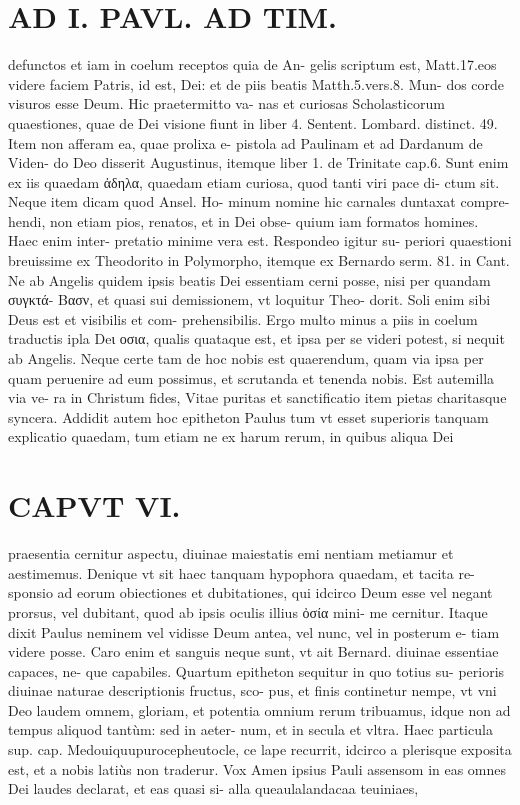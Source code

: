 \documentclass{article}
\begin{document}
\begin{pages}
\section*{AD I. PAVL. AD TIM. }
\marginpar{[ p.492 ]}\pstart defunctos et iam in coelum receptos quia de An- gelis scriptum est, Matt.17.eos videre faciem Patris, id est, Dei: et de piis beatis Matth.5.vers.8. Mun- dos corde visuros esse Deum. Hic praetermitto va- nas et curiosas Scholasticorum quaestiones, quae de Dei visione fiunt in liber 4. Sentent. Lombard. distinct. 49. Item non afferam ea, quae prolixa e- pistola ad Paulinam et ad Dardanum de Viden- do Deo disserit Augustinus, itemque liber 1. de Trinitate cap.6. Sunt enim ex iis quaedam ἀδηλα, quaedam etiam curiosa, quod tanti viri pace di- ctum sit. Neque item dicam quod Ansel. Ho- minum nomine hic carnales duntaxat compre- hendi, non etiam pios, renatos, et in Dei obse- quium iam formatos homines. Haec enim inter- pretatio minime vera est. Respondeo igitur su- periori quaestioni breuissime ex Theodorito in Polymorpho, itemque ex Bernardo serm. 81. in Cant. Ne ab Angelis quidem ipsis beatis Dei essentiam cerni posse, nisi per quandam συγκτά- Βασν, et quasi sui demissionem, vt loquitur Theo- dorit. Soli enim sibi Deus est et visibilis et com- prehensibilis. Ergo multo minus a piis in coelum traductis ipla Deι οσια, qualis quataque est, et ipsa per se videri potest, si nequit ab Angelis. Neque certe tam de hoc nobis est quaerendum, quam via ipsa per quam peruenire ad eum possimus, et scrutanda et tenenda nobis. Est autemilla via ve- ra in Christum fides, Vitae puritas et sanctificatio item pietas charitasque syncera.  \pend\pstart Addidit autem hoc epitheton Paulus tum vt esset superioris tanquam explicatio quaedam, tum etiam ne ex harum rerum, in quibus aliqua Dei  \pend
\section*{CAPVT VI. }
\marginpar{[ p.493 ]}\pstart praesentia cernitur aspectu, diuinae maiestatis emi nentiam metiamur et aestimemus. Denique vt sit haec tanquam hypophora quaedam, et tacita re- sponsio ad eorum obiectiones et dubitationes, qui idcirco Deum esse vel negant prorsus, vel dubitant, quod ab ipsis oculis illius ὀσία mini- me cernitur. Itaque dixit Paulus neminem vel vidisse Deum antea, vel nunc, vel in posterum e- tiam videre posse. Caro enim et sanguis neque sunt, vt ait Bernard. diuinae essentiae capaces, ne- que capabiles.  \pend\pstart Quartum epitheton sequitur in quo totius su- perioris diuinae naturae descriptionis fructus, sco- pus, et finis continetur nempe, vt vni Deo laudem omnem, gloriam, et potentia omnium rerum tribuamus, idque  non ad tempus aliquod tantùm: sed in aeter- num, et in secula et vltra. Haec particula sup. cap. Medouiquupurocepheutocle, ce lape recurrit, idcirco a plerisque exposita est, et a nobis latiùs non traderur. Vox Amen ipsius Pauli assensom in eas omnes Dei laudes declarat, et eas quasi si- alla queaulalandacaa teuiniaes,  \pend
{}
{}

\end{pages}
\end{document}
